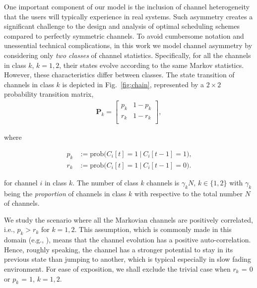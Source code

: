 \documentclass[11pt,twocolumn]{IEEEtran}
\begin{document}
One important component of our model is the inclusion of channel heterogeneity that the users will typically experience in real systems. Such asymmetry creates a significant challenge to the design and analysis of optimal scheduling schemes compared to perfectly symmetric channels. To avoid cumbersome notation and unessential technical complications, in this work we model channel asymmetry by considering only \emph{two classes} of channel statistics. Specifically, for all the channels in class $k$, $k{=}1,2$, their states evolve according to the same Markov statistics. However, these characteristics differ between classes. The state transition of channels in class $k$ is depicted in Fig.~\ref{fig:chain}, represented by a $2\times 2$ probability transition matrix,
\vspace{-4pt}
\begin{align}
\mathbb{\bm P}_k=\begin{bmatrix}
p_k&1-p_k\\
r_k&1-r_k\\
\end{bmatrix},\nonumber
\end{align}

\vspace{-7pt}
\noindent where

\vspace{-18pt}
\begin{align}
p_k&:= \textrm{prob$\big(C_i[t]{=}1 \ \big | \ C_i[t{-}1]{=}1\big)$,}\nonumber \\
r_k&:= \textrm{prob$\big(C_i[t]{=}1 \ \big | \ C_i[t{-}1]{=}0 \big)$.}\nonumber
\end{align}

\vspace{-4pt}
\noindent for channel $i$ in class $k$. The number of class $k$ channels is $\gamma_k N$, $k\in \{1,2\}$ with $\gamma_k$ being the \emph{proportion} of channels in class $k$ with respective to the total number $N$ of channels.

We study the scenario where all the Markovian channels are positively correlated, i.e., $p_k > r_k$ for $k{=}1,2$. This assumption, which is commonly made in this domain (e.g., \cite{Neely_capacity, Neely_utility, sugu_aslm}), means that the channel evolution has a positive auto-correlation. Hence, roughly speaking, the channel has a stronger potential to stay in its previous state than jumping to another, which is typical especially in slow fading environment. For ease of exposition, we shall exclude the trivial case when $r_k\hspace{1pt}{=}\hspace{1pt}0$ or $p_k\hspace{1pt}{=}\hspace{1pt}1$, $k=1,2$. \vspace{-5pt}
\end{document}
